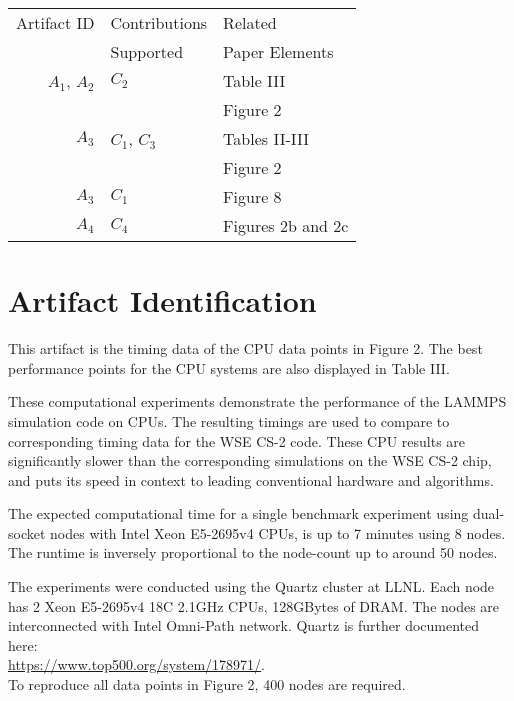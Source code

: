 \documentclass[conference]{IEEEtran}
\begin{document}
\begin{center}
\begin{tabular}{rll}
\toprule
Artifact ID  &  Contributions &  Related \\
             &  Supported     &  Paper Elements \\
\midrule
$A_1$, $A_2$   &  $C_2$ & Table III \\
        &        & Figure 2\\
\midrule
$A_3$   &  $C_1$, $C_3$ & Tables II-III \\
        &        & Figure 2\\
        \midrule
$A_3$   &  $C_1$ & Figure 8\\
$A_4$   &  $C_4$ & Figures 2b and 2c\\
\bottomrule
\end{tabular}
\end{center}

\section{Artifact Identification}

\newartifact

\artrel

This artifact is the timing data of the CPU data points in Figure 2. The best performance points for the CPU systems are also displayed in Table III.

\artexp

These computational experiments demonstrate the performance of the LAMMPS simulation code on CPUs. The resulting timings are used to compare to corresponding timing data for the WSE CS-2 code. These CPU results are significantly slower than the corresponding simulations on the WSE CS-2 chip, and puts its speed in context to leading conventional hardware and algorithms.

\arttime

The expected computational time for a single benchmark experiment using dual-socket nodes with Intel Xeon E5-2695v4 CPUs, is up to 7 minutes using 8 nodes. The runtime is inversely proportional to the node-count up to around 50 nodes.

\artin


The experiments were conducted using the Quartz cluster at LLNL. Each node has 2 Xeon E5-2695v4 18C 2.1GHz CPUs, 128GBytes of DRAM. The nodes are interconnected with Intel Omni-Path network. Quartz is further documented here:\\ \phantom{xxx}\url{https://www.top500.org/system/178971/}.\\
%
To reproduce all data points in Figure 2, 400 nodes are required.
\end{document}
